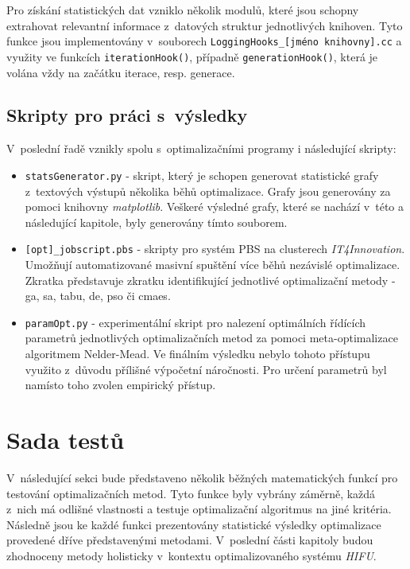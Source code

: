 Pro získání statistických dat vzniklo několik modulů, které jsou schopny extrahovat relevantní informace z~datových struktur jednotlivých knihoven. Tyto funkce jsou implementovány v~souborech \texttt{LoggingHooks\_[jméno knihovny].cc} a využity ve funkcích \texttt{iterationHook()}, případně \texttt{generationHook()}, která je volána vždy na začátku iterace, resp. generace.

\subsection{Skripty pro práci s~výsledky}
V~poslední řadě vznikly spolu s~optimalizačními programy i následující skripty:
\begin{itemize}
    \item \texttt{statsGenerator.py} - skript, který je schopen generovat statistické grafy z~textových výstupů několika běhů optimalizace. Grafy jsou generovány za pomoci knihovny \emph{matplotlib}. Veškeré výsledné grafy, které se nachází v~této a následující kapitole, byly generovány tímto souborem.
    \item \texttt{[opt]\_jobscript.pbs} - skripty pro systém PBS na clusterech \emph{IT4Innovation}. Umožňují automatizované masivní spuštění více běhů nezávislé optimalizace. Zkratka \textt{[opt]} představuje zkratku identifikující jednotlivé optimalizační metody - ga, sa, tabu, de, pso či cmaes.
    \item \texttt{paramOpt.py} - experimentální skript pro nalezení optimálních řídících parametrů jednotlivých optimalizačních metod za pomoci meta-optimalizace algoritmem Nelder-Mead. Ve finálním výsledku nebylo tohoto přístupu využito z~důvodu přílišné výpočetní náročnosti. Pro určení parametrů byl namísto toho zvolen empirický přístup.
\end{itemize}


\section{Sada testů}
\label{tests}
V~následující sekci bude představeno několik běžných matematických funkcí pro testování optimalizačních metod. Tyto funkce byly vybrány záměrně, každá z~nich má odlišné vlastnosti a testuje optimalizační algoritmus na jiné kritéria. Následně jsou ke každé funkci prezentovány statistické výsledky optimalizace provedené dříve představenými metodami. V~poslední části kapitoly budou zhodnoceny metody holisticky v~kontextu optimalizovaného systému \emph{HIFU}.

